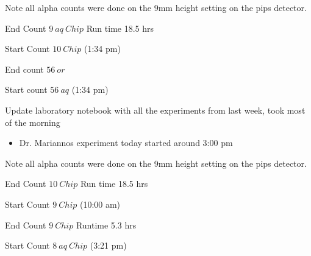 \documentclass[idxtotoc,hyperref,openany,oneside]{labbook} %
\newcommand{\cmark}{\ding{51}}%
\newcommand{\done}{\rlap{$\square$}{\raisebox{2pt}{\large\hspace{1pt}\cmark}}%
  \hspace{-2.5pt}}
\begin{document}


Note all alpha counts were done on the 9mm height setting
on the pips detector.
\begin{todolist}
\item[\done]{End Count $\boxed{9\ aq\ Chip}$ Run time 18.5 hrs}
\item[\done]{Start Count $\boxed{10\ Chip}$ (1:34 pm)}
\end{todolist}


\begin{todolist}
\item[\done]{End count $\boxed{56\ or}$}
\item[\done]{Start count $\boxed{56\ aq}$ (1:34 pm)}
\end{todolist}






\begin{todolist}
\item[\done]{Update laboratory notebook with all the experiments from last
  week, took most of the morning}
\end{todolist}

\begin{itemize}
\item{Dr. Mariannos experiment today started around 3:00 pm}
\end{itemize}

Note all alpha counts were done on the 9mm height setting
on the pips detector.
\begin{todolist}
\item[\done]{End Count $\boxed{10\ Chip}$ Run time 18.5 hrs}
\item[\done]{Start Count $\boxed{9\ Chip}$ (10:00 am)}
\item[\done]{End Count $\boxed{9\ Chip}$ Runtime 5.3 hrs}
\item[\done]{Start Count $\boxed{8\ aq\ Chip}$ (3:21 pm)}
\end{todolist}
\end{document}
